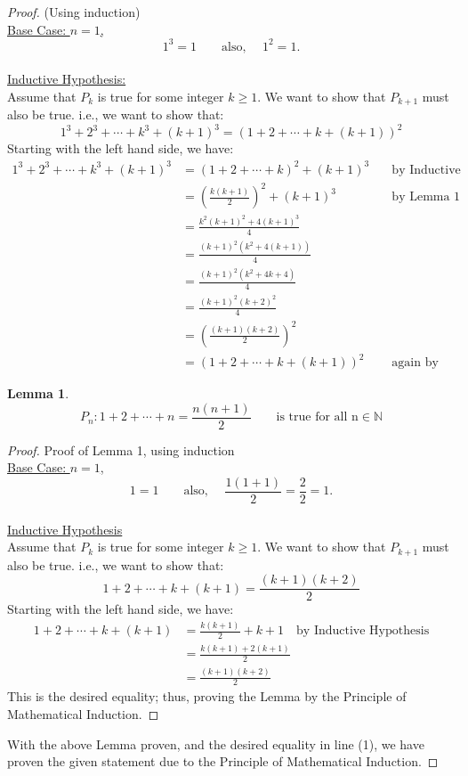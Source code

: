 \documentclass[10pt,a4paper]{article}
\newtheorem{lemma}{Lemma}
\begin{document}
\begin{proof}{(Using induction)}
\\\underline{Base Case: $n = 1$,}
\[1^3 = 1 \quad \quad \text{also, } \quad 1^2 = 1.\]
\\\underline{Inductive Hypothesis:}
\\Assume that $P_k$ is true for some integer $k \geq 1$. We want to show that $P_{k+1}$ must also be true. i.e., we want to show that:
\[1^3 + 2^3 + \cdots + k^3 + (k+1)^3 = (1 + 2 + \cdots + k + (k+1))^2\]
Starting with the left hand side, we have:
\begin{align}
1^3 + 2^3 + \cdots + k^3 + (k+1)^3 &= (1 + 2 + \cdots + k)^2 + (k+1)^3 &\quad \text{by Inductive Hypothesis}\nonumber\\
&= \left(\frac{k(k+1)}{2}\right)^2 + (k+1)^3 &\quad \text{by Lemma 1 below}\nonumber\\
&= \frac{k^2(k+1)^2 + 4(k+1)^3}{4}\nonumber\\
&= \frac{(k+1)^2(k^2 + 4(k+1))}{4}\nonumber\\
&= \frac{(k+1)^2(k^2 + 4k + 4)}{4}\nonumber\\
&= \frac{(k+1)^2(k+2)^2}{4}\nonumber\\
&= \left(\frac{(k+1)(k+2)}{2}\right)^2\nonumber\\
&= (1 + 2 + \cdots + k + (k+1))^2 &\quad \text{again by Lemma 1 below}
\end{align}

\begin{lemma}
\[P_n: 1 + 2 + \cdots + n = \frac{n(n+1)}{2} \quad \quad \text{is true for all n} \in \mathbb{N}\]
\end{lemma}
\begin{proof}{Proof of Lemma 1, using induction}
\\\underline{Base Case: $n = 1$,}
\[1 = 1 \quad \quad \text{also, } \quad \frac{1(1+1)}{2} = \frac{2}{2} = 1.\]
\\\underline{Inductive Hypothesis}
\\Assume that $P_k$ is true for some integer $k \geq 1$. We want to show that $P_{k+1}$ must also be true. i.e., we want to show that:
\[1 + 2 + \cdots + k + (k+1) = \frac{(k+1)(k+2)}{2}\]
Starting with the left hand side, we have:
\begin{align*}
1 + 2 + \cdots + k + (k+1) &= \frac{k(k+1)}{2} + k+1 \quad \text{by Inductive Hypothesis}\\
&= \frac{k(k+1) + 2(k+1)}{2}\\
&= \frac{(k+1)(k+2)}{2}
\end{align*}
This is the desired equality; thus, proving the Lemma by the Principle of Mathematical Induction. 
\end{proof}
With the above Lemma proven, and the desired equality in line (1), we have proven the given statement due to the Principle of Mathematical Induction.
\end{proof}
\end{document}
